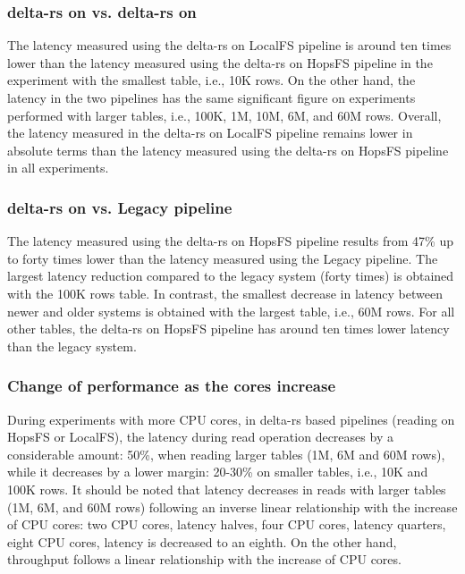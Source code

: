 \subsubsection*{delta-rs on  vs. delta-rs on }

The latency measured using the delta-rs on \gls{LocalFS} pipeline is around ten times lower than the latency measured using the delta-rs on \gls{HopsFS} pipeline in the experiment with the smallest table, i.e., 10K rows. On the other hand, the latency in the two pipelines has the same significant figure on experiments performed with larger tables, i.e., 100K, 1M, 10M, 6M, and 60M rows. Overall, the latency measured in the delta-rs on \gls{LocalFS} pipeline remains lower in absolute terms than the latency measured using the delta-rs on \gls{HopsFS} pipeline in all experiments.

\subsubsection*{delta-rs on  vs. Legacy pipeline}

The latency measured using the delta-rs on \gls{HopsFS} pipeline results from 47\% up to forty times lower than the latency measured using the Legacy pipeline. The largest latency reduction compared to the legacy system (forty times) is obtained with the 100K rows table. In contrast, the smallest decrease in latency between newer and older systems is obtained with the largest table, i.e., 60M rows. For all other tables, the delta-rs on \gls{HopsFS} pipeline has around ten times lower latency than the legacy system.

\subsubsection*{Change of performance as the  cores increase}

During experiments with more \gls{CPU} cores, in delta-rs based pipelines (reading on \gls{HopsFS} or \gls{LocalFS}), the latency during read operation decreases by a considerable amount: 50\%, when reading larger tables (1M, 6M and 60M rows), while it decreases by a lower margin: 20-30\% on smaller tables, i.e., 10K and 100K rows. It should be noted that latency decreases in reads with larger tables (1M, 6M, and 60M rows) following an inverse linear relationship with the increase of \gls{CPU} cores: two \gls{CPU} cores, latency halves, four \gls{CPU} cores, latency quarters, eight \gls{CPU} cores, latency is decreased to an eighth. On the other hand, throughput follows a linear relationship with the increase of \gls{CPU} cores.

